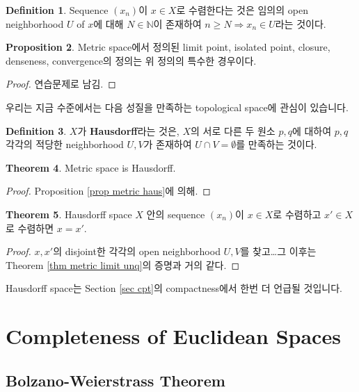 \documentclass[12pt]{article}
\theoremstyle{definition}
\newtheorem{thm}{Theorem}[section]
\newtheorem{prop}[thm]{Proposition}
\newtheorem{defn}[thm]{Definition}
\def\NN{\mathbb{N}}
\begin{document}
	\begin{defn}
		Sequence \((x_n)\)이 \(x \in X\)로 수렴한다는 것은 임의의 open neighborhood \(U\) of \(x\)에 대해 \(N \in \NN\)이 존재하여 \(n \ge N \Longrightarrow x_n \in U\)라는 것이다.
	\end{defn}

	\begin{prop}
		Metric space에서 정의된 limit point, isolated point, closure, denseness, convergence의 정의는 위 정의의 특수한 경우이다.
	\end{prop}
	\begin{proof}
		연습문제로 남김.
	\end{proof}

우리는 지금 수준에서는 다음 성질을 만족하는 topological space에 관심이 있습니다.

	\begin{defn}
		\(X\)가 \textbf{Hausdorff}라는 것은, \(X\)의 서로 다른 두 원소 \(p, q\)에 대하여 \(p, q\) 각각의 적당한 neighborhood \(U, V\)가 존재하여 \(U \cap V = \emptyset\)를 만족하는 것이다.
	\end{defn}

	\begin{thm}
		Metric space is Hausdorff.
	\end{thm}
	\begin{proof}
		Proposition \ref{prop metric haus}에 의해.
	\end{proof}
	
	\begin{thm}
		Hausdorff space \(X\) 안의 sequence \((x_n)\)이 \(x \in X\)로 수렴하고 \(x' \in X\)로 수렴하면 \(x = x'\).
	\end{thm}
	\begin{proof}
		\(x, x'\)의 disjoint한 각각의 open neighborhood \(U, V\)를 찾고\ldots 그 이후는 Theorem \ref{thm metric limit unq}의 증명과 거의 같다. 
	\end{proof}

Hausdorff space는 Section \ref{sec cpt}의 compactness에서 한번 더 언급될 것입니다.

\newpage

\section{Completeness of Euclidean Spaces}
\subsection{Bolzano-Weierstrass Theorem}
\end{document}
